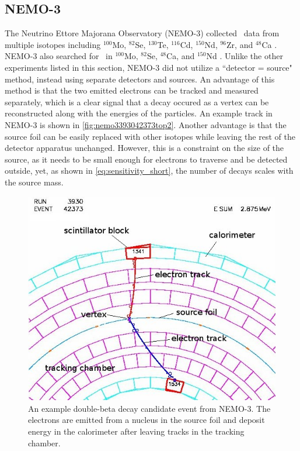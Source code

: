 \subsection{NEMO-3}
The Neutrino Ettore Majorana Observatory (NEMO-3) collected \twonubb~data from multiple isotopes including $^{100}$Mo, $^{82}$Se, $^{130}$Te, $^{116}$Cd, $^{150}$Nd, $^{96}$Zr, and $^{48}$Ca \cite{Bongrand:2011ei}.
NEMO-3 also searched for \zeronubb~in $^{100}$Mo, $^{82}$Se, $^{48}$Ca, and $^{150}$Nd \cite{Bongrand:2011ei}\cite{Arnold:2016qyg}\cite{Arnold:2016ezh}.
Unlike the other experiments listed in this section, NEMO-3 did not utilize a ``detector = source" method, instead using separate detectors and sources.
An advantage of this method is that the two emitted electrons can be tracked and measured separately, which is a clear signal that a decay occured as a vertex can be reconstructed along with the energies of the particles.
An example track in NEMO-3 is shown in \autoref{fig:nemo3393042373top2}.
Another advantage is that the source foil can be easily replaced with other isotopes while leaving the rest of the detector apparatus unchanged.
However, this is a constraint on the size of the source, as it needs to be small enough for electrons to traverse and be detected outside, yet, as shown in \autoref{eq:sensitivity_short}, the number of decays scales with the source mass.
\begin{figure}[htbp]
\centering
\includegraphics[width=0.7\linewidth]{Figures/nemo3_3930_42373_top_2}
\caption[An example double-beta decay candidate event from NEMO-3.]{An example double-beta decay candidate event from NEMO-3.
The electrons are emitted from a nucleus in the source foil and deposit energy in the calorimeter after leaving tracks in the tracking chamber.}
\label{fig:nemo3393042373top2}
\end{figure}
